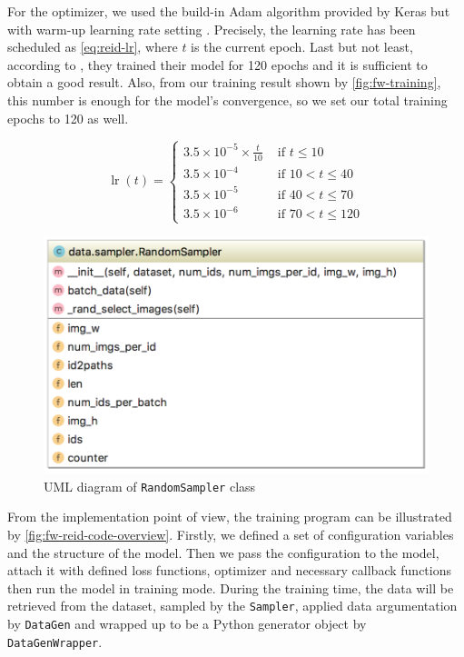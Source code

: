 For the optimizer, we used the build-in Adam algorithm provided by Keras
but with warm-up learning rate setting \cite{learning-rate-warmup-2018}.
Precisely, the learning rate has been scheduled as \autoref{eq:reid-lr}, where 
$t$ is the current epoch. Last but not least, according to
\cite{tricks-and-baseline-for-reid-2019}, they trained their model for 120
epochs and it is sufficient to obtain a good result. Also, from our training
result shown by \autoref{fig:fw-training}, this number is enough for the
model's convergence, so we set our total training epochs to 120 as well.

\begin{equation}
\label{eq:reid-lr}
\operatorname{lr}(t)=\left\{
\begin{array}{ll}
{3.5 \times 10^{-5} \times \frac{t}{10}} & {\text { if } t \leq 10} \\
{3.5 \times 10^{-4}} & {\text { if } 10<t \leq 40} \\
{3.5 \times 10^{-5}} & {\text { if } 40<t \leq 70} \\
{3.5 \times 10^{-6}} & {\text { if } 70<t \leq 120}
\end{array}\right.
\end{equation}

\begin{figure}
    \begin{center}
        \includegraphics[scale=0.6]{figures/framework_reid_sampler_uml.png}
    \end{center}
    \caption{UML diagram of \texttt{RandomSampler} class}
    \label{fig:fw-sampler-uml}
\end{figure}

From the implementation point of view, the training program can be illustrated by
\autoref{fig:fw-reid-code-overview}. Firstly, we defined a set of configuration
variables and the structure of the model. Then we pass the configuration to the
model, attach it with defined loss functions, optimizer and necessary
callback functions then run the model in training mode. During the training
time, the data will be retrieved from the dataset, sampled by the
\texttt{Sampler}, applied data argumentation by \texttt{DataGen} and wrapped
up to be a Python generator object by \texttt{DataGenWrapper}.

